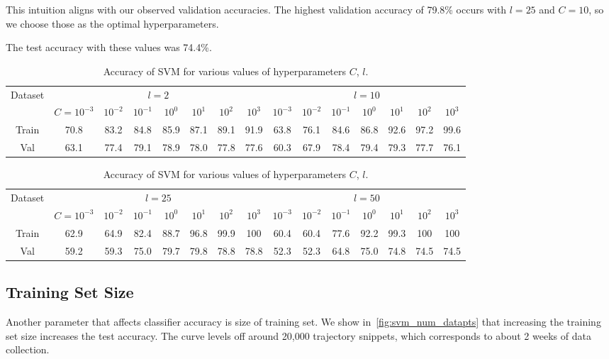 This intuition aligns with our observed validation accuracies.
The highest validation accuracy of 79.8\% occurs with $l=25$ and $C=10$, so we choose those as the optimal hyperparameters.

The test accuracy with these values was 74.4\%.

\begin{table}[ht!]
\centering
\begin{tabular}{||c| c c c c c c c| c c c c c c c||}  
 \hline
 \multirow{2}{*}{Dataset} &
       \multicolumn{7}{c|}{$l=2$} &
       \multicolumn{7}{c||}{$l=10$} \\
 & $C=10^{-3}$ & $10^{-2}$ & $10^{-1}$ & $10^{0}$ & $10^{1}$ & $10^{2}$ & $10^{3}$ & $10^{-3}$ & $10^{-2}$ & $10^{-1}$ & $10^{0}$ & $10^{1}$ & $10^{2}$ & $10^{3}$ \\ [0.5ex] 
 \hline\hline
 Train & 70.8 & 83.2 & 84.8 & 85.9 & 87.1 & 89.1 & 91.9 & 63.8 & 76.1 & 84.6 & 86.8 & 92.6 & 97.2 & 99.6  \\ \hline
 Val & 63.1 & 77.4 & 79.1 & 78.9 & 78.0 & 77.8 & 77.6 & 60.3 & 67.9 & 78.4 & 79.4 & 79.3 & 77.7 & 76.1  \\ \hline
\end{tabular}
\begin{tabular}{||c| c c c c c c c| c c c c c c c||}  
 \hline
 \multirow{2}{*}{Dataset} &
       \multicolumn{7}{c|}{$l=25$} &
       \multicolumn{7}{c||}{$l=50$} \\
 & $C=10^{-3}$ & $10^{-2}$ & $10^{-1}$ & $10^{0}$ & $10^{1}$ & $10^{2}$ & $10^{3}$ & $10^{-3}$ & $10^{-2}$ & $10^{-1}$ & $10^{0}$ & $10^{1}$ & $10^{2}$ & $10^{3}$ \\ [0.5ex] 
 \hline\hline
 Train & 62.9 & 64.9 & 82.4 & 88.7 & 96.8 & 99.9 & 100 & 60.4 & 60.4 & 77.6 & 92.2 & 99.3 & 100 & 100  \\ \hline
 Val & 59.2 & 59.3 & 75.0 & 79.7 & 79.8 & 78.8 & 78.8 & 52.3 & 52.3 & 64.8 & 75.0 & 74.8 & 74.5 & 74.5  \\ \hline
\end{tabular}
\caption{Accuracy of SVM for various values of hyperparameters $C$, $l$.}
\label{table_svm}
\end{table}

\subsection{Training Set Size}
Another parameter that affects classifier accuracy is size of training set.
We show in~\cref{fig:svm_num_datapts} that increasing the training set size increases the test accuracy.
The curve levels off around 20,000 trajectory snippets, which corresponds to about 2 weeks of data collection.

